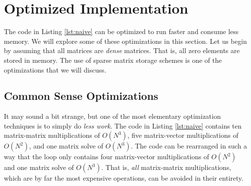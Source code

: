 \section{Optimized Implementation}

The code in Listing \ref{lst:naive} can be optimized to run faster and consume less memory. We will explore some of these optimizations in this section. Let us begin by assuming that all matrices are \emph{dense} matrices. That is, all zero elements are stored in memory. The use of sparse matrix storage schemes is one of the optimizations that we will discuss.

\subsection{Common Sense Optimizations}

It may sound a bit strange, but one of the most elementary optimization techniques is to simply do \emph{less work}. The code in Listing \ref{lst:naive} contains ten matrix-matrix multiplications of $O(N^3)$, five matrix-vector multiplications of $O(N^2)$, and one matrix solve of $O(N^3)$. The code can be rearranged in such a way that the loop only contains four matrix-vector multiplications of $O(N^2)$ and one matrix solve of $O(N^3)$. That is, \emph{all} matrix-matrix multiplications, which are by far the most expensive operations, can be avoided in their entirety. 

